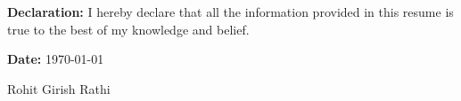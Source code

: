 \documentclass[11pt]{article}
\begin{document}
\begin{center}
\begin{minipage}[t]{0.6\textwidth}
\begin{LARGE}
\begin{tabu}
				\end{tabu}
			\end{LARGE}
		\end{minipage}%
		\linebreak\linebreak\linebreak
		\medskip
		\raggedright
		\textbf{Declaration:} I hereby declare that all the information provided in this resume is true to the best of my knowledge and belief.\linebreak\linebreak
		\begin{minipage}[t]{0.5\textwidth}
			\raggedright
			\textbf{Date:} \today
		\end{minipage}%
		\begin{minipage}[t]{0.5\textwidth}
			\raggedleft
			Rohit Girish Rathi
		\end{minipage}%
	\end{center}
\end{document}
